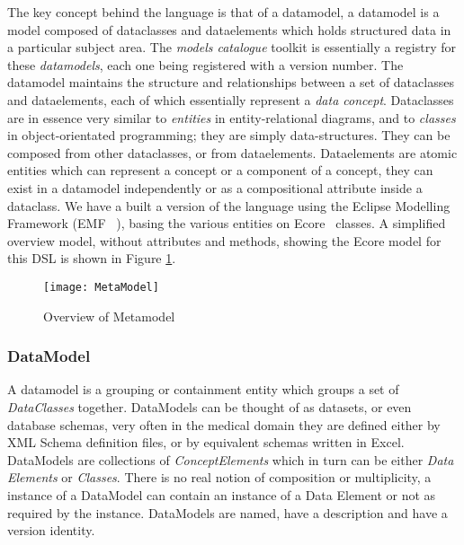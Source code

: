 The key concept behind the language is that of a datamodel, a datamodel is a model composed of dataclasses and dataelements which holds structured data in a particular subject area. The \emph{models catalogue} toolkit is essentially a registry for these \emph{datamodels}, each one being registered with a version number. The datamodel maintains the structure and relationships between a set of dataclasses and dataelements, each of which essentially represent a \emph{data concept}. Dataclasses are in essence very similar to \emph{entities} in entity-relational diagrams, and to \emph{classes} in object-orientated programming; they are simply data-structures. They can be composed from other dataclasses, or from dataelements. Dataelements are atomic entities which can represent a concept or a component of a concept, they can exist in a datamodel independently or as a compositional attribute inside a dataclass. We have a built a version of the language using the Eclipse Modelling Framework (EMF ~\cite{EMF}), basing the various entities on Ecore~\cite{ECORE} classes. A simplified overview model, without attributes and methods, showing the Ecore model for this DSL is shown in Figure \ref{fig:mcSimplifiedOverview}.
\begin{figure}[here]
	\texttt{[image: MetaModel]}
	\caption{Overview of Metamodel} 
	\label{fig:mcSimplifiedOverview}
\end{figure}

\subsubsection{DataModel}
A datamodel is a grouping or containment entity which groups a set of \emph{DataClasses} together. DataModels can be thought of as datasets, or even database schemas, very often in the medical domain they are defined either by XML Schema definition files, or by equivalent schemas written in Excel. 
DataModels are collections of \emph{ConceptElements} which in turn can be either \emph{Data Elements} or \emph{Classes}. There is no real notion of composition or multiplicity, a instance of a DataModel can contain an instance of a Data Element or not as required by the instance.  DataModels are named, have a description and have a version identity.
